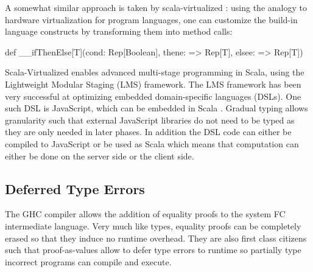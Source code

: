 A somewhat similar approach is taken by scala-virtualized \cite{scala-virtualized}: using the analogy to hardware virtualization for program languages, one can customize the build-in language constructs by transforming them into method calls:

\begin{lstlisting-nobreak}
def __ifThenElse[T](cond: Rep[Boolean], thene: => Rep[T], elsee: => Rep[T])
\end{lstlisting-nobreak}

Scala-Virtualized enables advanced multi-stage programming in Scala, using the Lightweight Modular Staging (LMS) framework. The LMS framework has been very successful at optimizing embedded domain-specific languages (DSLs). One such DSL is JavaScript, which can be embedded in Scala \cite{greg-js-dsl}. Gradual typing allows granularity such that external JavaScript libraries do not need to be typed as they are only needed in later phases. In addition the DSL code can either be compiled to JavaScript or be used as Scala which means  that computation can either be done on the server side or the client side.

\subsection{Deferred Type Errors}

The GHC\cite{haskell-deferred-type-errors} compiler allows the addition of equality proofs to the system FC intermediate language. Very much like types, equality proofs can be completely erased so that they induce no runtime overhead. They are also first class citizens such that proof-as-values allow to defer type errors to runtime so partially type incorrect programs can compile and execute.


\newcommand{\DS}{\begin{sideways}DuctileScala\end{sideways}}
\newcommand{\hask}{\begin{sideways}Haskell\end{sideways}}
\newcommand{\dyn}{\begin{sideways}Dynamic / Scala-JS\;\end{sideways}}
\newcommand{\SV}{\begin{sideways}Scala-Virtualized\end{sideways}}
\newcommand{\dart}{\begin{sideways}Dart\end{sideways}}
\newcommand{\DL}{\begin{sideways}dynamic languages\end{sideways}}
\newcommand{\JSLMS}{\begin{sideways}JS on LMS\end{sideways}}
\newcommand{\SD}{\begin{sideways}ScalaDyno\end{sideways}}

